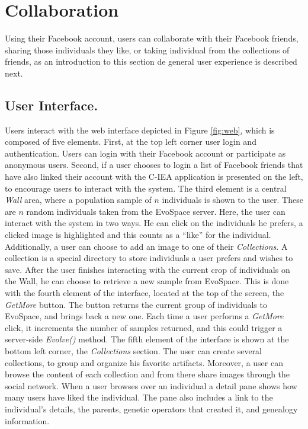 \documentclass{sig-alternate}
\begin{document}
\section{Collaboration}
Using their Facebook account, users can collaborate with their Facebook friends, sharing those individuals they like, or taking individual from the collections of friends, as an introduction to this section de general user experience is described next.

\subsection{User Interface.}
Users interact with the web interface depicted in Figure \ref{fig:web}, which is composed of five elements.
First, at the top left corner user login and authentication.
Users can login with their Facebook account or participate as anonymous users.
Second, if a user chooses to login a list of Facebook friends that have also linked their account with the C-IEA application is presented on the left, to encourage users to interact with the system. The third element is a central \emph{ Wall } area, where a population sample of $n$ individuals is shown to the user.
These are $n$ random individuals taken from the EvoSpace server.
Here, the user can interact with the system in two ways.
He can click on the individuals he prefers, a clicked image is highlighted and this counts as a ``like'' for the individual.
Additionally, a user can choose to add an image to one of their \emph{Collections}.
A collection is a special directory to store individuals a user prefers and wishes to save. After the user finishes interacting with the current crop of individuals on the Wall, he can choose to retrieve a new sample from EvoSpace.
This is done with the fourth element of the interface, located at the top of the screen, the \emph{GetMore} button.
The button returns the current group of individuals to EvoSpace, and brings back a new one.
Each time a user performs a \emph{GetMore} click, it increments the number of samples returned, and this could  trigger a server-side \emph{Evolve()} method. The fifth element of the interface is shown at the bottom left corner, the \emph{Collections} section.
The user can create several collections, to group and organize his favorite artifacts.
Moreover, a user can browse the content of each collection and from there share images through the social network.
When a user browses over an individual a detail pane shows how many users have liked the individual.
The pane also includes a link to the individual's details, the parents, genetic operators that created it, and genealogy information.
\end{document}
